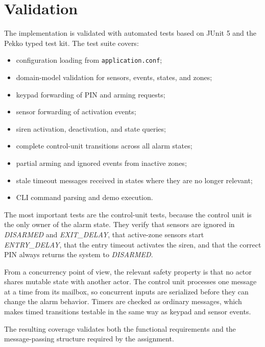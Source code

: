 \section{Validation}

The implementation is validated with automated tests based on JUnit 5 and the Pekko typed test kit.
The test suite covers:
\begin{itemize}
    \item configuration loading from \texttt{application.conf};
    \item domain-model validation for sensors, events, states, and zones;
    \item keypad forwarding of PIN and arming requests;
    \item sensor forwarding of activation events;
    \item siren activation, deactivation, and state queries;
    \item complete control-unit transitions across all alarm states;
    \item partial arming and ignored events from inactive zones;
    \item stale timeout messages received in states where they are no longer relevant;
    \item CLI command parsing and demo execution.
\end{itemize}

The most important tests are the control-unit tests, because the control unit is the only owner of the alarm state.
They verify that sensors are ignored in \textit{DISARMED} and \textit{EXIT\_DELAY}, that active-zone sensors start
\textit{ENTRY\_DELAY}, that the entry timeout activates the siren, and that the correct PIN always returns the system to
\textit{DISARMED}.

From a concurrency point of view, the relevant safety property is that no actor shares mutable state with another actor.
The control unit processes one message at a time from its mailbox, so concurrent inputs are serialized before they can
change the alarm behavior.
Timers are checked as ordinary messages, which makes timed transitions testable in the same way as keypad and sensor
events.

The resulting coverage validates both the functional requirements and the message-passing structure required by the
assignment.
